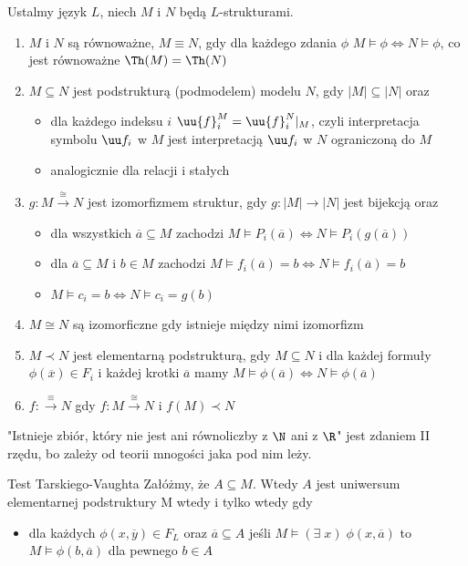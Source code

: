 Ustalmy język $L$, niech $M$ i $N$ będą $L$-strukturami.

\begin{definition}{}{}
  \begin{enumerate}
    \item $M$ i $N$ są równoważne, $M\equiv N$, gdy dla każdego zdania $\phi$ $M\models\phi\iff N\models\phi$, co jest równoważne $\Th(M)=\Th(N)$
    \item $M\subseteq N$ jest podstrukturą (podmodelem) modelu $N$, gdy $|M|\subseteq|N|$ oraz
      \begin{itemize}
        \item dla każdego indeksu $i$ $\uu{f}_i^M=\uu{f}_i^N|_M$, czyli interpretacja symbolu $\uu f_i$ w $M$ jest interpretacją $\uu f_i$ w $N$ ograniczoną do $M$
        \item analogicznie dla relacji i stałych
      \end{itemize}
    \item $g:M\xrightarrow{\cong}N$ jest izomorfizmem struktur, gdy $g:|M|\to|N|$ jest bijekcją oraz
      \begin{itemize}
        \item dla wszystkich $\overline{a}\subseteq M$ zachodzi $M\models P_i(\overline{a})\iff N\models P_i(g(\overline{a}))$
        \item dla $\overline{a}\subseteq M$ i $b\in M$ zachodzi $M\models f_i(\overline{a})=b\iff N\models f_i(\overline{a})=b$
        \item $M\models c_i=b\iff N\models c_i=g(b)$
      \end{itemize}
    \item $M\cong N$ są izomorficzne gdy istnieje między nimi izomorfizm
    \item $M\prec N$ jest elementarną podstrukturą, gdy $M\subseteq N$ i dla każdej formuły $\phi(\overline{x})\in F_i$ i każdej krotki $\overline{a}$ mamy $M\models \phi(\overline{a})\iff N\models\phi(\overline{a})$
    \item $f:\xrightarrow{\equiv}N$ gdy $f:M\xrightarrow{\cong}N$ i $f(M)\prec N$
  \end{enumerate}
\end{definition}

"Istnieje zbiór, który nie jest ani równoliczby z $\N$ ani z $\R$" jest zdaniem II rzędu, bo zależy od teorii mnogości jaka pod nim leży.

\begin{theorem}{Test Tarskiego-Vaughta}{} 
  Załóżmy, że $A\subseteq M$. Wtedy $A$ jest uniwersum elementarnej podstruktury M wtedy i tylko wtedy gdy 
  \begin{itemize}
    \item dla każdych $\phi(x, \overline{y})\in F_L$ oraz $\overline{a}\subseteq A$ jeśli $M\models(\exists\;x)\;\phi(x,\overline{a})$ to $M\models \phi(b, \overline{a})$ dla pewnego $b\in A$
  \end{itemize}
\end{theorem}

